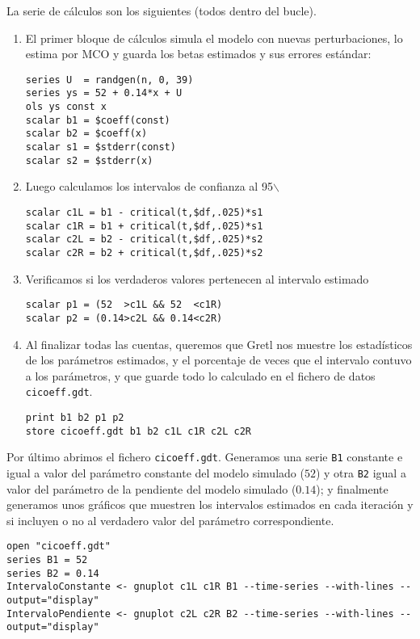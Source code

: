 \documentclass[11pt]{article}
\begin{document}
La serie de cálculos son los siguientes (todos dentro del bucle).

\begin{enumerate}
\item El primer bloque de cálculos simula el modelo con nuevas
perturbaciones, lo estima por MCO y guarda los betas estimados y
sus errores estándar:
\begin{verbatim}
series U  = randgen(n, 0, 39)
series ys = 52 + 0.14*x + U
ols ys const x
scalar b1 = $coeff(const)
scalar b2 = $coeff(x)
scalar s1 = $stderr(const)
scalar s2 = $stderr(x)
\end{verbatim}

\item Luego calculamos los intervalos de confianza al 95$\backslash$%
\begin{verbatim}
scalar c1L = b1 - critical(t,$df,.025)*s1
scalar c1R = b1 + critical(t,$df,.025)*s1
scalar c2L = b2 - critical(t,$df,.025)*s2
scalar c2R = b2 + critical(t,$df,.025)*s2
\end{verbatim}

\item Verificamos si los verdaderos valores pertenecen al intervalo estimado
\begin{verbatim}
scalar p1 = (52  >c1L && 52  <c1R)
scalar p2 = (0.14>c2L && 0.14<c2R)
\end{verbatim}

\item Al finalizar todas las cuentas, queremos que Gretl nos muestre los
estadísticos de los parámetros estimados, y el porcentaje de veces
que el intervalo contuvo a los parámetros, y que guarde todo lo
calculado en el fichero de datos \texttt{cicoeff.gdt}.
\begin{verbatim}
print b1 b2 p1 p2 
store cicoeff.gdt b1 b2 c1L c1R c2L c2R 
\end{verbatim}
\end{enumerate}

Por último abrimos el fichero \texttt{cicoeff.gdt}. Generamos una serie \texttt{B1}
constante e igual a valor del parámetro constante del modelo simulado (\(52\))
y otra \texttt{B2} igual a valor del parámetro de la pendiente del modelo
simulado (\(0.14\)); y finalmente generamos unos gráficos que muestren los
intervalos estimados en cada iteración y si incluyen o no al verdadero
valor del parámetro correspondiente.
\begin{verbatim}
open "cicoeff.gdt"
series B1 = 52
series B2 = 0.14
IntervaloConstante <- gnuplot c1L c1R B1 --time-series --with-lines --output="display"
IntervaloPendiente <- gnuplot c2L c2R B2 --time-series --with-lines --output="display"
\end{verbatim}
\end{document}
